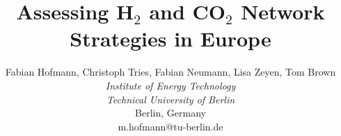 \documentclass[twocolumn]{article}
\newcommand{\carbon}{CO$_2$}
\newcommand{\hydrogen}{H$_2$}
\begin{document}

\title{Assessing \hydrogen{} and \carbon{} Network Strategies in Europe}

\author{
    Fabian Hofmann, Christoph Tries, Fabian Neumann, Lisa Zeyen, Tom Brown \\
    \textit{Institute of Energy Technology} \\
    \textit{Technical University of Berlin}\\
    Berlin, Germany \\
    m.hofmann@tu-berlin.de
}


\maketitle
\end{document}

